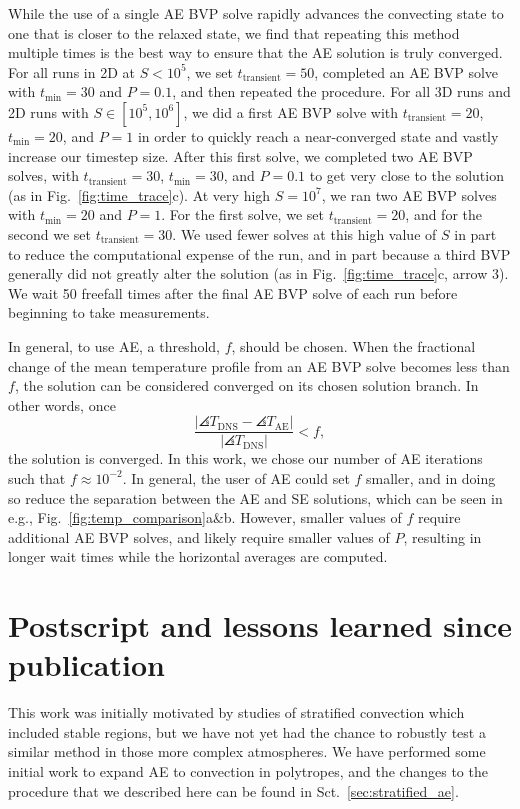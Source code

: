 While the use of a single AE BVP solve rapidly advances the convecting state to one that is closer to the relaxed state, we find that repeating this method multiple times is the best way to ensure that the AE solution is truly converged. 
For all runs in 2D at $S < 10^5$, we set $t_{\text{transient}} = 50$, completed an AE BVP solve with $t_{\text{min}} = 30$ and $P = 0.1$, and then repeated the procedure.
For all 3D runs and 2D runs with $S \in [10^5, 10^6]$, we did a first AE BVP solve with $t_{\text{transient}} = 20$, $t_{\text{min}} = 20$, and $P = 1$ in order to quickly reach a near-converged state and vastly increase our timestep size.  
After this first solve, we completed two AE BVP solves, with $t_{\text{transient}} = 30$, $t_{\text{min}} = 30$, and $P = 0.1$ to get very close to the solution (as in Fig.~\ref{fig:time_trace}c).
At very high $S = 10^7$, we ran two AE BVP solves with $t_{\text{min}} = 20$ and $P = 1$. For the first solve, we set $t_{\text{transient}} = 20$, and for the second we set $t_{\text{transient}} = 30$. 
We used fewer solves at this high value of $S$ in part to reduce the computational expense of the run, and in part because a third BVP generally did not greatly alter the solution (as in Fig.~\ref{fig:time_trace}c, arrow 3). 
We wait 50 freefall times after the final AE BVP solve of each run before beginning to take measurements.

In general, to use AE, a threshold, $f$, should be chosen. 
When the fractional change of the mean temperature profile from an AE BVP solve becomes less than $f$, the solution can be considered converged on its chosen solution branch.
In other words, once
\begin{equation}
\frac{|\angles{T}_{\text{DNS}} - \angles{T}_{\text{AE}}|}{|\angles{T}_{\text{DNS}}|} < f,
\end{equation}
the solution is converged. 
In this work, we chose our number of AE iterations such that $f \approx 10^{-2}$.  
In general, the user of AE could set $f$ smaller, and in doing so reduce the separation between the AE and SE solutions, which can be seen in e.g., Fig.~\ref{fig:temp_comparison}a\&b. 
However, smaller values of $f$ require additional AE BVP solves, and likely require smaller values of $P$, resulting in longer wait times while the horizontal averages are computed.

\newpage
\section{Postscript and lessons learned since publication}
\label{sec:abo18_postscript}
This work was initially motivated by studies of stratified convection which included stable regions, but we have not yet had the chance to robustly test a similar method in those more complex atmospheres.
We have performed some initial work to expand AE to convection in polytropes, and the changes to the procedure that we described here can be found in Sct.~\ref{sec:stratified_ae}.

